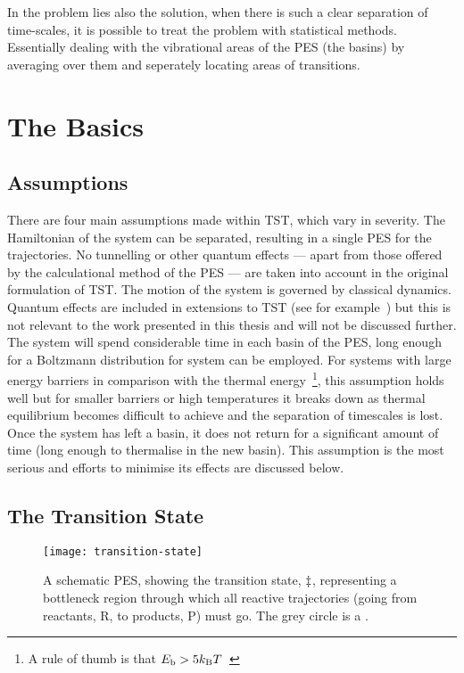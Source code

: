 In the problem lies also the solution, when there is such a clear separation of time-scales, it is possible to treat the problem with statistical methods.
Essentially dealing with the vibrational areas of the PES (the basins) by averaging over them and seperately locating areas of transitions.

\section{The Basics}
\subsection{Assumptions}
There are four main assumptions made within TST, which vary in severity.
The Hamiltonian of the system can be separated, resulting in a single PES for the trajectories.
No tunnelling or other quantum effects --- apart from those offered by the calculational method of the PES --- are taken into account in the original formulation of TST.
The motion of the system is governed by classical dynamics.
Quantum effects are included in extensions to TST (see for example~\cite{qtst-hj-1997, qtst-hj-1998, qtst-hj-2009}) but this is not relevant to the work presented in this thesis and will not be discussed further.
The system will spend considerable time in each basin of the PES, long enough for a Boltzmann distribution for system can be employed.
For systems with large energy barriers in comparison with the thermal energy~\footnote{A rule of thumb is that $E_\text{b} > 5k_\text{B} T$~\cite{htst-5ev-2005}}, this assumption holds well but for smaller barriers or high temperatures it breaks down as thermal equilibrium becomes difficult to achieve and the separation of timescales is lost.
Once the system has left a basin, it does not return for a significant amount of time (long enough to thermalise in the new basin).
This assumption is the most serious and efforts to minimise its effects are discussed below.

\subsection{The Transition State}

\begin{figure}[h]
\begin{center}
\texttt{[image: transition-state]}
    \parbox{0.85\linewidth}{
\caption{A schematic PES, showing the transition state, $\ddagger$, representing a bottleneck region through which all reactive trajectories (going from reactants, R, to products, P) must go.
The grey circle is a .
}
\label{fig:transition-state}
    }
\end{center}
\end{figure}

